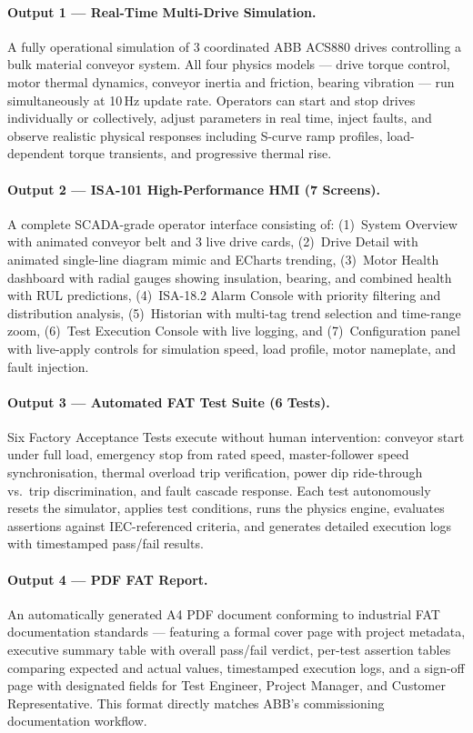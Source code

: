 \documentclass[9pt,a4paper,twocolumn,twoside]{tau-class/tau}
\begin{document}
\paragraph{Output 1 — Real-Time Multi-Drive Simulation.}
A fully operational simulation of 3 coordinated ABB ACS880 drives controlling a bulk material conveyor system. All four physics models — drive torque control, motor thermal dynamics, conveyor inertia and friction, bearing vibration — run simultaneously at 10\,Hz update rate. Operators can start and stop drives individually or collectively, adjust parameters in real time, inject faults, and observe realistic physical responses including S-curve ramp profiles, load-dependent torque transients, and progressive thermal rise.

\paragraph{Output 2 — ISA-101 High-Performance HMI (7 Screens).}
A complete SCADA-grade operator interface consisting of: (1)~System Overview with animated conveyor belt and 3 live drive cards, (2)~Drive Detail with animated single-line diagram mimic and ECharts trending, (3)~Motor Health dashboard with radial gauges showing insulation, bearing, and combined health with RUL predictions, (4)~ISA-18.2 Alarm Console with priority filtering and distribution analysis, (5)~Historian with multi-tag trend selection and time-range zoom, (6)~Test Execution Console with live logging, and (7)~Configuration panel with live-apply controls for simulation speed, load profile, motor nameplate, and fault injection.

\paragraph{Output 3 — Automated FAT Test Suite (6 Tests).}
Six Factory Acceptance Tests execute without human intervention: conveyor start under full load, emergency stop from rated speed, master-follower speed synchronisation, thermal overload trip verification, power dip ride-through vs.\ trip discrimination, and fault cascade response. Each test autonomously resets the simulator, applies test conditions, runs the physics engine, evaluates assertions against IEC-referenced criteria, and generates detailed execution logs with timestamped pass/fail results.

\paragraph{Output 4 — PDF FAT Report.}
An automatically generated A4 PDF document conforming to industrial FAT documentation standards — featuring a formal cover page with project metadata, executive summary table with overall pass/fail verdict, per-test assertion tables comparing expected and actual values, timestamped execution logs, and a sign-off page with designated fields for Test Engineer, Project Manager, and Customer Representative. This format directly matches ABB's commissioning documentation workflow.
\end{document}
